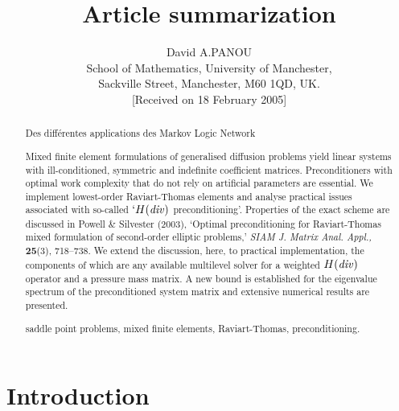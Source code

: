 \documentclass{imamci}
\numberwithin{equation}{section}
\begin{document}
\title{Article summarization}
\author{ {\sc David A.PANOU}\\[2pt]
School of Mathematics, University of Manchester, \\
 Sackville Street, Manchester, M60 1QD, UK.\\[6pt]
{\rm [Received on 18 February 2005]}\vspace*{6pt}}
\pagestyle{headings}
\maketitle


\begin{abstract}
{
Des différentes applications des Markov Logic Network

Mixed finite element formulations of generalised diffusion problems yield linear systems with  ill-conditioned, symmetric and indefinite coefficient matrices. Preconditioners with optimal work complexity that do not rely on artificial parameters are essential. We implement lowest-order Raviart-Thomas elements and analyse practical issues associated with so-called $`H({\it
div})$ preconditioning'. Properties of the exact scheme are discussed in  Powell \& Silvester (2003), `Optimal preconditioning for Raviart-Thomas mixed formulation of second-order elliptic problems,' \textit{SIAM J. Matrix Anal. Appl.,} \textbf{25}(3), 718--738. We extend the discussion, here, to practical implementation, the components of which are any available multilevel solver for a weighted $H({\it div})$ operator and a pressure mass matrix. A new bound is established for the eigenvalue spectrum of the preconditioned system matrix and extensive numerical results are presented.}
{saddle point problems, mixed finite elements, Raviart-Thomas, preconditioning.}
\end{abstract}



\section{Introduction}

\end{document}
